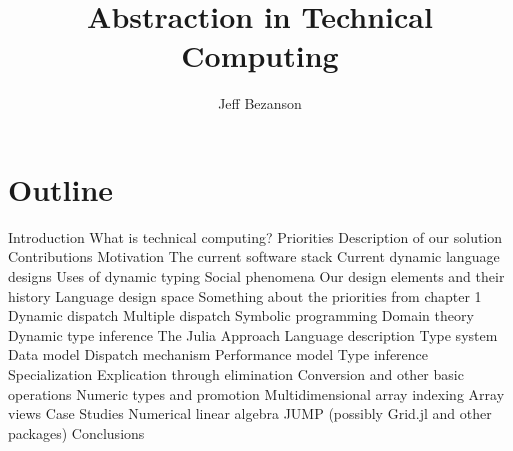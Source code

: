 \documentclass[12pt]{article}
\title{Abstraction in Technical Computing}
\author{Jeff Bezanson}
\begin{document}
\maketitle

\section{Outline}

\begin{outline}[enumerate]
  \1 Introduction
    \2 What is technical computing?
      \3 Priorities
    \2 Description of our solution
    \2 Contributions
  \1 Motivation
    \2 The current software stack
    \2 Current dynamic language designs
    \2 Uses of dynamic typing
    \2 Social phenomena
    \2 Our design elements and their history
      \3 Language design space
        \4 Something about the priorities from chapter 1
      \3 Dynamic dispatch
      \3 Multiple dispatch
        \4 Symbolic programming
      \3 Domain theory
      \3 Dynamic type inference
  \1 The Julia Approach
    \2 Language description
      \3 Type system
      \3 Data model
      \3 Dispatch mechanism
    \2 Performance model
      \3 Type inference
      \3 Specialization
    \2 Explication through elimination
      \3 Conversion and other basic operations
      \3 Numeric types and promotion
      \3 Multidimensional array indexing
      \3 Array views
  \1 Case Studies
    \2 Numerical linear algebra
    \2 JUMP
    \2 (possibly Grid.jl and other packages)
  \1 Conclusions
\end{outline}
\end{document}
